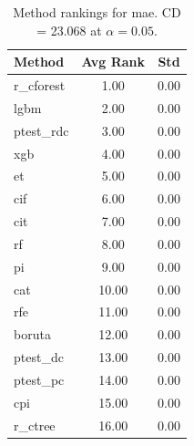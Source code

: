 \begin{table}[h]
\centering
\caption{Method rankings for mae. CD = 23.068 at $\alpha=0.05$.}
\label{tab:ranks_mae}
\begin{tabular}{lcc}
\toprule
Method & Avg Rank & Std \\
\midrule
r_cforest & 1.00 & 0.00 \\
lgbm & 2.00 & 0.00 \\
ptest_rdc & 3.00 & 0.00 \\
xgb & 4.00 & 0.00 \\
et & 5.00 & 0.00 \\
cif & 6.00 & 0.00 \\
cit & 7.00 & 0.00 \\
rf & 8.00 & 0.00 \\
pi & 9.00 & 0.00 \\
cat & 10.00 & 0.00 \\
rfe & 11.00 & 0.00 \\
boruta & 12.00 & 0.00 \\
ptest_dc & 13.00 & 0.00 \\
ptest_pc & 14.00 & 0.00 \\
cpi & 15.00 & 0.00 \\
r_ctree & 16.00 & 0.00 \\
\bottomrule
\end{tabular}
\end{table}